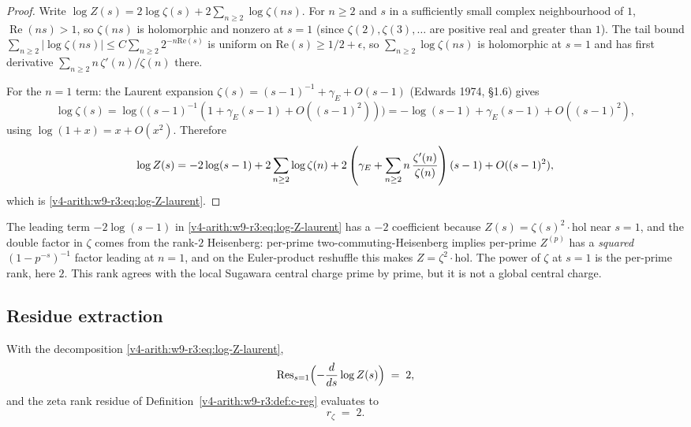 \begin{proof}
Write \(\log Z(s)=2\log\zeta(s)+2\sum_{n\geq 2}\log\zeta(ns)\). For
\(n\geq2\) and \(s\) in a sufficiently small complex neighbourhood
of \(1\), \(\operatorname{Re}(ns)>1\), so \(\zeta(ns)\) is
holomorphic and nonzero at \(s=1\) (since
\(\zeta(2),\zeta(3),\ldots\) are positive real and greater than \(1\)).
The tail bound \(\sum_{n\geq 2}|\log\zeta(ns)|\leq C\sum_{n\geq 2}2^{-n\mathrm{Re}(s)}\)
is uniform on \(\mathrm{Re}(s)\geq 1/2+\epsilon\), so \(\sum_{n\geq 2}\log\zeta(ns)\)
is holomorphic at \(s=1\) and has first derivative
\(\sum_{n\geq2}n\,\zeta'(n)/\zeta(n)\) there.

For the \(n=1\) term: the Laurent expansion \(\zeta(s)=(s-1)^{-1}+\gamma_{E}+O(s-1)\)
(Edwards 1974, \S 1.6) gives
\[
\log\zeta(s)=\log\bigl((s-1)^{-1}(1+\gamma_{E}(s-1)+O((s-1)^{2}))\bigr)
=-\log(s-1)+\gamma_{E}(s-1)+O((s-1)^{2}),
\]
using \(\log(1+x)=x+O(x^{2})\). Therefore
\[
\log Z(s)
=-2\log(s-1)+2\sum_{n\geq 2}\log\zeta(n)
+2\left(\gamma_{E}+\sum_{n\geq2}n\,{\zeta'(n)\over\zeta(n)}\right)(s-1)
+O((s-1)^{2}),
\]
which is \eqref{v4-arith:w9-r3:eq:log-Z-laurent}.
\end{proof}

\begin{remark}
\label{v4-arith:w9-r3:rem:residue-is-2}
The leading term \(-2\log(s-1)\) in \eqref{v4-arith:w9-r3:eq:log-Z-laurent}
has a \(-2\) coefficient because \(Z(s)=\zeta(s)^{2}\cdot\mathrm{hol}\)
near \(s=1\), and the double factor in \(\zeta\) comes from the
rank-\(2\) Heisenberg: per-prime two-commuting-Heisenberg implies
per-prime \(Z^{(p)}\) has a \emph{squared} \((1-p^{-s})^{-1}\) factor
leading at \(n=1\), and on the Euler-product reshuffle this makes
\(Z=\zeta^{2}\cdot\mathrm{hol}\). The power of \(\zeta\) at \(s=1\) is
the per-prime rank, here \(2\). This rank agrees with the local
Sugawara central charge prime by prime, but it is not a global central
charge.
\end{remark}

\subsection{Residue extraction}
\label{v4-arith:w9-r3:residue}

\begin{theorem}[residue at \(s=1\)]
\label{v4-arith:w9-r3:thm:residue-at-1}
With the decomposition
\eqref{v4-arith:w9-r3:eq:log-Z-laurent},
\begin{equation}
\label{v4-arith:w9-r3:eq:residue-extraction}
\mathrm{Res}_{s=1}\Bigl(-\frac{d}{ds}\log Z(s)\Bigr)\;=\;2,
\end{equation}
and the zeta rank residue of
Definition~\ref{v4-arith:w9-r3:def:c-reg} evaluates to
\begin{equation}
\label{v4-arith:w9-r3:eq:c-reg-is-2}
r_{\zeta}\;=\;2.
\end{equation}
\end{theorem}

